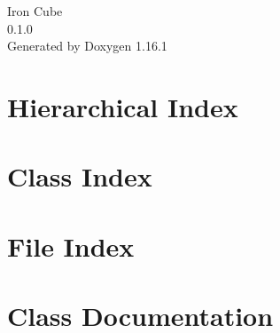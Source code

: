 \documentclass[twoside]{book}
\newcommand{\+}{\discretionary{\mbox{\scriptsize$\hookleftarrow$}}{}{}}
\newcommand{\clearemptydoublepage}{%
    \newpage{\pagestyle{empty}\cleardoublepage}%
  }
\begin{document}
  \raggedbottom
    \hypersetup{pageanchor=false,
                bookmarksnumbered=true,
                pdfencoding=unicode
               }
  \begin{titlepage}
  \vspace*{7cm}
  \begin{center}%
  {\Large Iron Cube}\\
  [1ex]\large 0.\+1.\+0 \\
  \vspace*{1cm}
  {\large Generated by Doxygen 1.16.1}\\
  \end{center}
  \end{titlepage}
  \clearemptydoublepage
  \tableofcontents
  \clearemptydoublepage
  \hypersetup{pageanchor=true}
\chapter{Hierarchical Index}

\chapter{Class Index}

\chapter{File Index}

\chapter{Class Documentation}



















\end{document}
